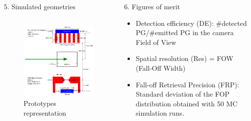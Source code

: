 \documentclass[final]{beamer} %
\begin{document}
\begin{frame}{}
\begin{columns}[t]
\begin{column}{0.49\textwidth}
\begin{block}{5. Simulated geometries}
\begin{columns}[t]
				\begin{column}{0.5\textwidth}
					\begin{figure}
						\includegraphics[width=\textwidth]{./figures/detectors_cyl}
						\caption{Prototypes representation}
						\label{CamerasScheme}
					\end{figure}					
				\end{column}				

			\end{columns}

	  \end{block}		  
	\end{column} %
	
	\begin{column}{0.49\textwidth} %
	  \vspace{-2ex}
		
		
		
		\begin{block}{6. Figures of merit\label{FOM}}
			
			\begin{itemize}
				\item Detection efficiency (DE): \#detected PG/\#emitted PG in the camera Field of View
				\item Spatial resolution (Res) = FOW (Fall-Off Width)
				\item Fall-off Retrieval Precision (FRP): Standard deviation of the FOP distribution obtained with 50 MC simulation runs.
			\end{itemize}



\end{block}
\end{column}
\end{columns}
\end{frame}
\end{document}
